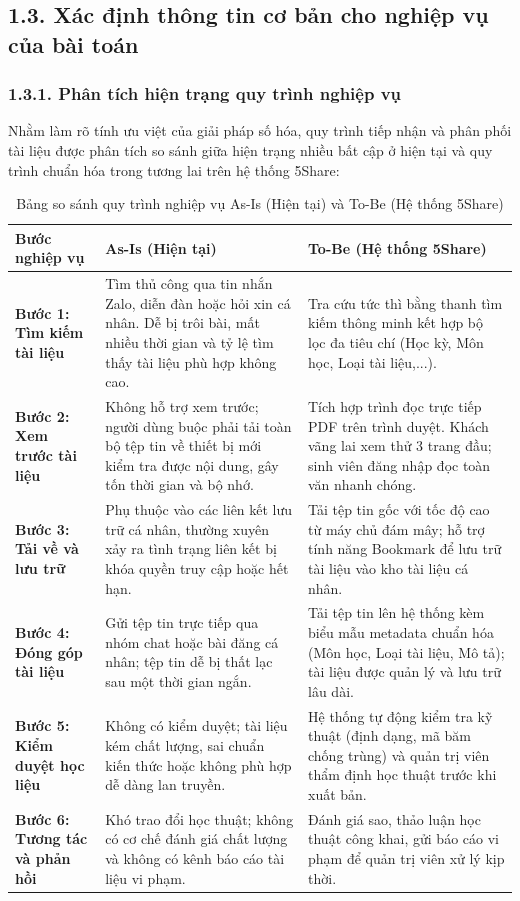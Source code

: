 \subsection{1.3. Xác định thông tin cơ bản cho nghiệp vụ của bài toán}

\subsubsection{1.3.1. Phân tích hiện trạng quy trình nghiệp vụ}
Nhằm làm rõ tính ưu việt của giải pháp số hóa, quy trình tiếp nhận và phân phối tài liệu được phân tích so sánh giữa hiện trạng nhiều bất cập ở hiện tại và quy trình chuẩn hóa trong tương lai trên hệ thống 5Share:

\begin{table}[H]
\centering
\small
\renewcommand{\arraystretch}{1.25}
\begin{tabularx}{\textwidth}{|p{3.5cm}|X|X|}
\hline
\rowcolor[HTML]{EAEAEA}
\textbf{Bước nghiệp vụ} & \textbf{As-Is (Hiện tại)} & \textbf{To-Be (Hệ thống 5Share)} \\
\hline
\textbf{Bước 1: Tìm kiếm tài liệu} & Tìm thủ công qua tin nhắn Zalo, diễn đàn hoặc hỏi xin cá nhân. Dễ bị trôi bài, mất nhiều thời gian và tỷ lệ tìm thấy tài liệu phù hợp không cao. & Tra cứu tức thì bằng thanh tìm kiếm thông minh kết hợp bộ lọc đa tiêu chí (Học kỳ, Môn học, Loại tài liệu,...). \\
\hline
\textbf{Bước 2: Xem trước tài liệu} & Không hỗ trợ xem trước; người dùng buộc phải tải toàn bộ tệp tin về thiết bị mới kiểm tra được nội dung, gây tốn thời gian và bộ nhớ. & Tích hợp trình đọc trực tiếp PDF trên trình duyệt. Khách vãng lai xem thử 3 trang đầu; sinh viên đăng nhập đọc toàn văn nhanh chóng. \\
\hline
\textbf{Bước 3: Tải về và lưu trữ} & Phụ thuộc vào các liên kết lưu trữ cá nhân, thường xuyên xảy ra tình trạng liên kết bị khóa quyền truy cập hoặc hết hạn. & Tải tệp tin gốc với tốc độ cao từ máy chủ đám mây; hỗ trợ tính năng Bookmark để lưu trữ tài liệu vào kho tài liệu cá nhân. \\
\hline
\textbf{Bước 4: Đóng góp tài liệu} & Gửi tệp tin trực tiếp qua nhóm chat hoặc bài đăng cá nhân; tệp tin dễ bị thất lạc sau một thời gian ngắn. & Tải tệp tin lên hệ thống kèm biểu mẫu metadata chuẩn hóa (Môn học, Loại tài liệu, Mô tả); tài liệu được quản lý và lưu trữ lâu dài. \\
\hline
\textbf{Bước 5: Kiểm duyệt học liệu} & Không có kiểm duyệt; tài liệu kém chất lượng, sai chuẩn kiến thức hoặc không phù hợp dễ dàng lan truyền. & Hệ thống tự động kiểm tra kỹ thuật (định dạng, mã băm chống trùng) và quản trị viên thẩm định học thuật trước khi xuất bản. \\
\hline
\textbf{Bước 6: Tương tác và phản hồi} & Khó trao đổi học thuật; không có cơ chế đánh giá chất lượng và không có kênh báo cáo tài liệu vi phạm. & Đánh giá sao, thảo luận học thuật công khai, gửi báo cáo vi phạm để quản trị viên xử lý kịp thời. \\
\hline
\end{tabularx}
\caption{Bảng so sánh quy trình nghiệp vụ As-Is (Hiện tại) và To-Be (Hệ thống 5Share)}
\label{tab:as_is_to_be}
\end{table}

